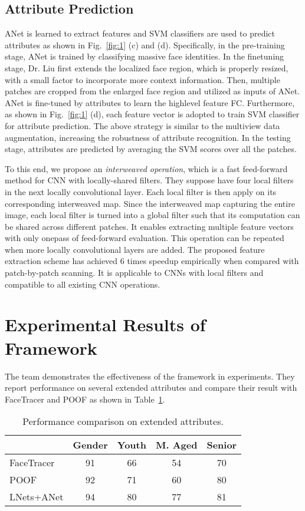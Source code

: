 \documentclass[10pt,twocolumn,letterpaper]{article}
\begin{document}
\subsection{Attribute Prediction}

ANet is learned to extract features and SVM classifiers are used to predict attributes as shown in Fig.~\ref{fig:1} (c) and (d). Specifically, in the pre-training stage, ANet is trained by classifying massive face identities. In the finetuning stage, Dr. Liu first extends the localized face region, which is properly resized, with a small factor to incorporate more context information. Then, multiple patches are cropped from the enlarged face region and utilized as inputs of ANet. ANet is fine-tuned by attributes to learn the highlevel feature FC. Furthermore, as shown in Fig.~\ref{fig:1} (d), each feature vector is adopted to train SVM classifier for attribute prediction. The above strategy is similar to the multiview data augmentation, increasing the robustness of attribute recognition. In the testing stage, attributes are predicted by averaging the SVM scores over all the patches.

To this end, we propose an \emph{interweaved operation}, which is a fast feed-forward method for CNN with locally-shared filters. They suppose have four local filters in the next locally
convolutional layer. Each local filter is then apply on its corresponding interweaved map. Since the interweaved map capturing the entire image, each local filter is turned into a global filter such that its computation can be shared across different patches. It enables extracting multiple feature vectors with only onepass of feed-forward evaluation. This operation can be repeated when more locally convolutional layers are added. The proposed feature extraction scheme has achieved 6 times speedup empirically when compared with patch-by-patch scanning. It is applicable to CNNs with local filters and compatible to all existing CNN operations.

\section{Experimental Results of Framework}

The team demonstrates the effectiveness of the framework in experiments. They report performance on several extended attributes and compare their result with FaceTracer and POOF as shown in Table~\ref{Test}.

\begin{table}[hpbt]
	\caption{Performance comparison on extended attributes.} \label{Test}
	\begin{center}
		\begin{tabular}{|l|c|c|c|c|}
			\hline
			 & Gender & Youth& M. Aged & Senior\\
			\hline\hline
			FaceTracer \cite{Kumar2008FaceTracer} & 91&66 & 54& 70 \\
		    POOF \cite{Berg2013POOF}  & 92 &71 &60 &80 \\			
			LNets+ANet & 94 & 80 &77 &81\\
			\hline
		\end{tabular} 
	\end{center}
\end{table}


{\small


}
\end{document}
